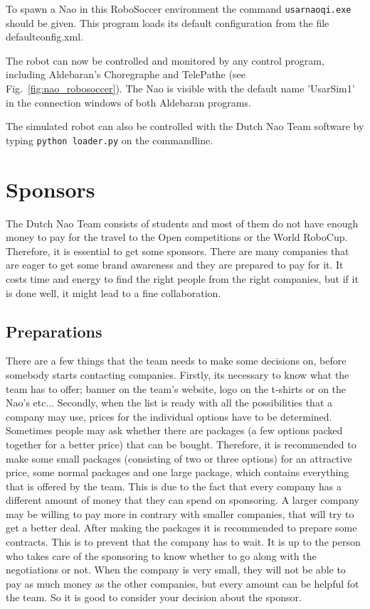 \documentclass[11pt,a4paper,oneside]{article}
\begin{document}
To spawn a Nao in this RoboSoccer environment the command \texttt{usarnaoqi.exe} should be given. This program loads its default configuration from the file defaultconfig.xml.

The robot can now be controlled and monitored by any control program, including Aldebaran's Choregraphe and TelePathe (see Fig.~\ref{fig:nao_robosoccer}). The Nao is visible with the default name 'UsarSim1' in the connection windows of both Aldebaran programs.

The simulated robot can also be controlled with the Dutch Nao Team software by typing \texttt{python loader.py} on the commandline.

\section{Sponsors}
The Dutch Nao Team consists of students and most of them do not have enough money to pay for the travel to the Open competitions or the World RoboCup. Therefore, it is essential to get some sponsors. There are many companies that are eager to get some brand awareness and they are prepared to pay for it. It costs time and energy to find the right people from the right companies, but if it is done well, it might lead to a fine collaboration.

\subsection{Preparations}
There are a few things that the team needs to make some decisions on, before somebody starts contacting companies. Firstly, its necessary to know what the team has to offer; banner on the team's website, logo on the t-shirts or on the Nao's etc... Secondly, when the list is ready with all the possibilities that a company may use, prices for the individual options have to be determined. Sometimes people may ask whether there are packages (a few options packed together for a better price) that can be bought. Therefore, it is recommended to make some small packages (consisting of two or three options) for an attractive price, some normal packages and one large package, which contains everything that is offered by the team. This is due to the fact that every company has a different amount of money that they can spend on sponsoring. A larger company may be willing to pay more in contrary with smaller companies, that will try to get a better deal. After making the packages it is recommended to prepare some contracts. This is to prevent that the company has to wait.  It is up to the person who takes care of the sponsoring to know whether to go along with the negotiations or not. When the company is very small, they will not be able to pay as much money as the other companies, but every amount can be helpful fot the team. So it is good to consider your decision about the sponsor.
\end{document}
